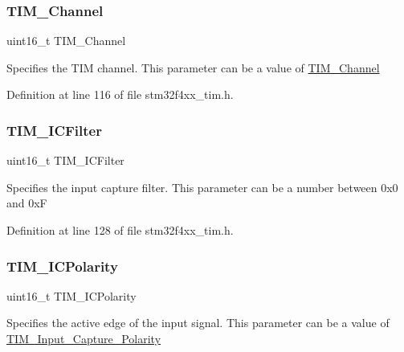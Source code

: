 \subsubsection{\texorpdfstring{T\+I\+M\+\_\+\+Channel}{TIM\_Channel}}
{\footnotesize\ttfamily uint16\+\_\+t T\+I\+M\+\_\+\+Channel}

Specifies the T\+IM channel. This parameter can be a value of \hyperlink{group___t_i_m___channel}{T\+I\+M\+\_\+\+Channel} 

Definition at line 116 of file stm32f4xx\+\_\+tim.\+h.

\mbox{\label{struct_t_i_m___i_c_init_type_def_a751574b5d1f66bea6c3405d2975e420a}} 
\subsubsection{\texorpdfstring{T\+I\+M\+\_\+\+I\+C\+Filter}{TIM\_ICFilter}}
{\footnotesize\ttfamily uint16\+\_\+t T\+I\+M\+\_\+\+I\+C\+Filter}

Specifies the input capture filter. This parameter can be a number between 0x0 and 0xF 

Definition at line 128 of file stm32f4xx\+\_\+tim.\+h.

\mbox{\label{struct_t_i_m___i_c_init_type_def_a71dc0cc2f4eb59451ea323719b0741bb}} 
\subsubsection{\texorpdfstring{T\+I\+M\+\_\+\+I\+C\+Polarity}{TIM\_ICPolarity}}
{\footnotesize\ttfamily uint16\+\_\+t T\+I\+M\+\_\+\+I\+C\+Polarity}

Specifies the active edge of the input signal. This parameter can be a value of \hyperlink{group___t_i_m___input___capture___polarity}{T\+I\+M\+\_\+\+Input\+\_\+\+Capture\+\_\+\+Polarity} 

